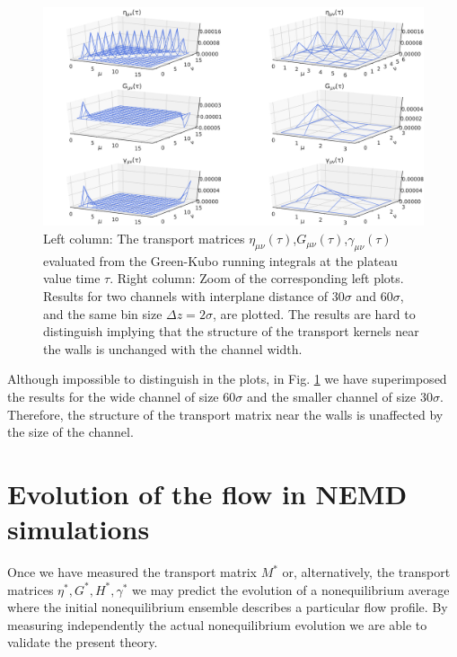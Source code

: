\documentclass[b5paper,openright,10pt]{book}
\begin{document}
\begin{figure}[]
\includegraphics[width=\linewidth]{Etatau-matrix-17nodes-WALLS}
\caption[The transport matrices evaluated from the Green-Kubo running integrals at the plateau value time for a confined fluid - Thick bins]{Left column: The                     transport                    matrices
  $\eta_{\mu\nu}(\tau)$,$G_{\mu\nu}(\tau)$,$\gamma_{\mu\nu}(\tau)$
  evaluated from the Green-Kubo running integrals at the plateau value
  time $\tau$. Right column: Zoom  of  the corresponding left plots.  Results  for  two channels  with
  interplane distance of  $30\sigma$ and $60\sigma$, and  the same bin
  size  $\Delta  z=2\sigma$, are  plotted.  The  results are  hard  to
  distinguish implying that the structure of the transport kernels near
  the walls is unchanged with the channel width.}
\label{Fig-GK-zoom}
\end{figure}

Although   impossible   to  distinguish   in   the   plots,  in   Fig.
\ref{Fig-GK-zoom}  we  have  superimposed  the results  for  the  wide
channel  of   size  60$\sigma$  and   the  smaller  channel   of  size
30$\sigma$. Therefore, the structure of  the transport matrix near the
walls is unaffected by the size of the channel.


\section{Evolution of the flow in NEMD simulations}
Once we  have measured the  transport matrix $M^*$  or, alternatively,
the transport  matrices $\eta^*,G^*,H^*,\gamma^*$  we may  predict the
evolution   of   a   nonequilibrium   average   where   the   initial
nonequilibrium  ensemble describes  a  particular  flow profile.   By
measuring independently  the actual  nonequilibrium evolution  we are
able to validate the present theory.
\end{document}
